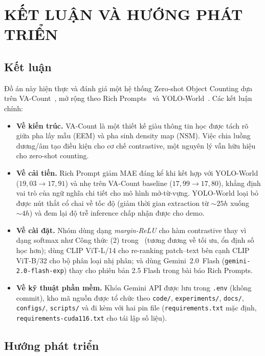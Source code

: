 \documentclass[a4paper,12pt]{report}
\numberwithin{figure}{chapter}
\numberwithin{table}{chapter}
\begin{document}
\chapter{KẾT LUẬN VÀ HƯỚNG PHÁT TRIỂN}
\label{ch:conclusion}

\section{Kết luận}
Đồ án này hiện thực và đánh giá một hệ thống Zero-shot Object Counting dựa trên VA-Count~\cite{vacount}, mở rộng theo Rich Prompts~\cite{richprompts} và YOLO-World~\cite{yoloworld}. Các kết luận chính:

\begin{itemize}
    \item \textbf{Về kiến trúc.} VA-Count là một thiết kế giàu thông tin học được tách rõ giữa pha lấy mẫu (EEM) và pha sinh density map (NSM). Việc chia luồng dương/âm tạo điều kiện cho cơ chế contrastive, một nguyên lý vẫn hữu hiệu cho zero-shot counting.
    \item \textbf{Về cải tiến.} Rich Prompt giảm MAE đáng kể khi kết hợp với YOLO-World ($19{,}03 \to 17{,}91$) và nhẹ trên VA-Count baseline ($17{,}99 \to 17{,}80$), khẳng định vai trò của ngữ nghĩa chi tiết cho mô hình mở-từ-vựng. YOLO-World loại bỏ được nút thắt cổ chai về tốc độ (giảm thời gian extraction từ $\sim 25h$ xuống $\sim 4h$) và đem lại độ trễ inference chấp nhận được cho demo.
    \item \textbf{Về cài đặt.} Nhóm dùng dạng \emph{margin-ReLU} cho hàm contrastive thay vì dạng softmax như Công thức (2) trong~\cite{vacount} (tương đương về tối ưu, ổn định số học hơn); dùng CLIP ViT-L/14 cho re-ranking patch--text bên cạnh CLIP ViT-B/32 cho bộ phân loại nhị phân; và dùng Gemini~2.0~Flash (\texttt{gemini-2.0-flash-exp}) thay cho phiên bản 2.5 Flash trong bài báo Rich Prompts.
    \item \textbf{Về kỹ thuật phần mềm.} Khóa Gemini API được lưu trong \texttt{.env} (không commit), kho mã nguồn được tổ chức theo \texttt{code/}, \texttt{experiments/}, \texttt{docs/}, \texttt{configs/}, \texttt{scripts/} và đi kèm với hai pin file (\texttt{requirements.txt} mặc định, \texttt{requirements-cuda116.txt} cho tái lập số liệu).
\end{itemize}

\section{Hướng phát triển}
\end{document}
